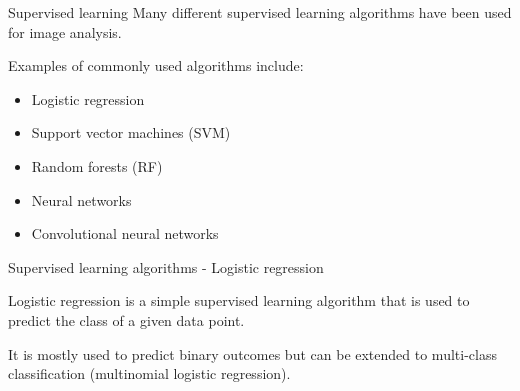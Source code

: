 \documentclass[9pt, aspectratio=169]{beamer}
\begin{document}
\begin{frame}
    {Supervised learning}
    Many different supervised learning algorithms have been used for image analysis.

    Examples of commonly used algorithms include:

    \begin{itemize}
        \item Logistic regression
        \item Support vector machines (SVM)
        \item Random forests (RF)
        \item Neural networks
        \item Convolutional neural networks
    \end{itemize}
\end{frame}

\begin{frame}
    {Supervised learning algorithms - Logistic regression}
    \centering

    Logistic regression is a simple supervised learning algorithm that is used to predict the class of a given data point.

    It is mostly used to predict binary outcomes but can be extended to multi-class classification (multinomial logistic regression).
\end{frame}
\end{document}
